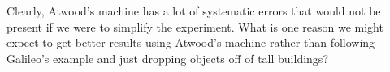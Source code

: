 \documentclass[addpoints]{physlabs}
\begin{document}
\begin{postlab}
\begin{solution}[2cm]
    \end{solution}

    \filbreak
    \question

    \filbreak
    \question[1] Clearly, Atwood's machine has a lot of systematic errors that would not be present if we were to simplify the experiment. What is one reason we might expect to get better results using Atwood's machine rather than following Galileo’s example and just dropping objects off of tall buildings?
    \begin{solution}[1.5cm]
            
    \end{solution}

    
\end{postlab}
\end{document}
